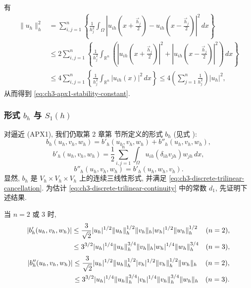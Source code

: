 \begin{Proof}
有
\begin{align*}
\lVert u_h\rVert_h^2
&=\sum_{i,j=1}^n\left\{\frac1{h_j^2}\int_{\Omega}
\left|u_{ih}\left(x+\frac{\vec h_j}{2}\right)-u_{ih}\left(x-\frac{\vec h_j}{2}\right)\right|^2\,dx\right\}\\
&\leq2\sum_{i,j=1}^n\left\{\frac1{h_j^2}\int_{\mathbb R^n}
\left(\left|u_{ih}\left(x+\frac{\vec h_j}{2}\right)\right|^2+
\left|u_{ih}\left(x-\frac{\vec h_j}{2}\right)\right|^2\right)\,dx\right\}\\
&\leq4\sum_{i,j=1}^n\left\{\frac1{h_j^2}\int_{\mathbb R^n}|u_{ih}(x)|^2\,dx\right\}
\leq4\left(\sum_{j=1}^n\frac1{h_j^2}\right)|u_h|^2,
\end{align*}
从而得到 \eqref{eq:ch3-apx1-stability-constant}.
\end{Proof}

\subsubsection{形式 $b_h$ 与 $S_1(h)$}
对逼近 (APX1), 我们仍取第 2 章第  节所定义的形式 $b_h$ (见式 ):
\begin{equation}
b_h(u_h,v_h,w_h)=b'_h(u_h,v_h,w_h)+b''_h(u_h,v_h,w_h),
\label{eq:ch3-apx1-bh-decomposition}
\end{equation}
\begin{equation}
b'_h(u_h,v_h,w_h)=\frac12\sum_{i,j=1}^n\int_{\Omega}u_{ih}(\delta_{ih}v_{jh})w_{jh}\,dx,
\label{eq:ch3-apx1-bh-prime}
\end{equation}
\begin{equation}
b''_h(u_h,v_h,w_h)=b'_h(u_h,w_h,v_h).
\label{eq:ch3-apx1-bh-double-prime}
\end{equation}
显然, $b_h$ 是 $V_h\times V_h\times V_h$ 上的连续三线性形式, 并满足 \eqref{eq:ch3-discrete-trilinear-cancellation}. 为估计 \eqref{eq:ch3-discrete-trilinear-continuity} 中的常数 $d_1$, 先证明下述结果.

\begin{Lemma}
\label{lem:ch3-apx1-trilinear-components}
当 $n=2$ 或 $3$ 时,
\begin{align}
|b'_h(u_h,v_h,w_h)|
&\leq\frac3{\sqrt2}|u_h|^{1/2}\lVert u_h\rVert_h^{1/2}\lVert v_h\rVert_h
|w_h|^{1/2}\lVert w_h\rVert_h^{1/2} &&(n=2),\notag\\
&\leq3^{3/2}|u_h|^{1/4}\lVert u_h\rVert_h^{3/4}\lVert v_h\rVert_h
|w_h|^{1/4}\lVert w_h\rVert_h^{3/4} &&(n=3),
\label{eq:ch3-apx1-bh-prime-estimate}
\end{align}
\begin{align}
|b''_h(u_h,v_h,w_h)|
&\leq\frac3{\sqrt2}|u_h|^{1/2}\lVert u_h\rVert_h^{1/2}
|v_h|^{1/2}\lVert v_h\rVert_h^{1/2}\lVert w_h\rVert_h &&(n=2),\notag\\
&\leq3^{3/2}|u_h|^{1/4}\lVert u_h\rVert_h^{3/4}
|v_h|^{1/4}\lVert v_h\rVert_h^{3/4}\lVert w_h\rVert_h &&(n=3).
\label{eq:ch3-apx1-bh-double-prime-estimate}
\end{align}
\end{Lemma}

